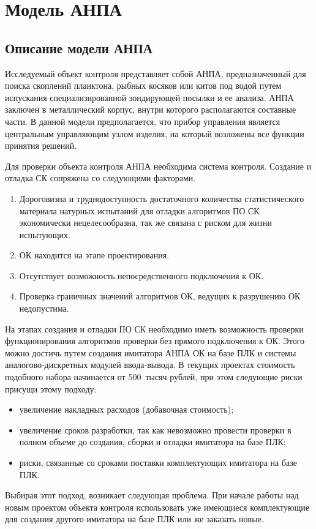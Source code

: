 \chapter{Модель АНПА}
\section{Описание модели АНПА} \label{sec:model_anpa}

Исследуемый объект контроля представляет собой АНПА, предназначенный для поиска скоплений планктона,
рыбных косяков или китов под водой путем испускания специализированной зондирующей посылки и ее анализа.
АНПА заключен в металлический корпус, внутри которого располагаются составные части.
В данной модели предполагается, что прибор управления является центральным управляющим узлом изделия,
на который возложены все функции принятия решений.

Для проверки объекта контроля АНПА необходима система контроля.
Создание и отладка СК сопряжена со следующими факторами.
\begin{enumerate}
    \item Дороговизна и труднодоступность достаточного количества статистического материала
    натурных испытаний для отладки алгоритмов ПО СК экономически нецелесообразна, так же связана с риском для жизни испытующих.
    \item ОК находится на этапе проектирования.
    \item Отсутствует возможность непосредственного подключения к ОК.
    \item Проверка граничных значений алгоритмов ОК, ведущих к разрушению ОК недопустима.
\end{enumerate}
На этапах создания и отладки ПО СК необходимо иметь возможность проверки
функционирования алгоритмов проверки без прямого подключения к ОК.
Этого можно достичь путем создания имитатора АНПА ОК на базе ПЛК и системы аналогово-дискретных
модулей ввода-вывода.
В текущих проектах стоимость подобного набора начинается от 500~тысяч рублей,
при этом следующие риски присущи этому подходу:
\begin{itemize}
    \item увеличение накладных расходов (добавочная стоимость);
    \item увеличение сроков разработки, так как невозможно провести проверки в полном объеме до 
        создания, сборки и отладки имитатора на базе ПЛК;
    \item риски, связанные со сроками поставки комплектующих имитатора на базе ПЛК.
\end{itemize}
Выбирая этот подход, возникает следующая проблема. При начале работы над новым проектом объекта контроля
использовать уже имеющиеся комплектующие для создания другого имитатора на базе ПЛК или же заказать новые.

